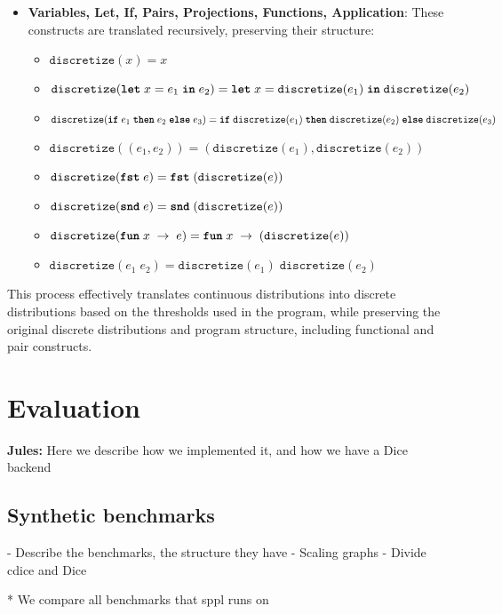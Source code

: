 \documentclass[acmsmall,screen,dvipsnames,x11names,nonacm,anonymous,review]{acmart}
\newcommand{\jules}[1]{{\color{blue}\textbf{Jules:} #1}}
\newcommand{\letkw}{\text{\ttfamily\bfseries let}}
\newcommand{\inkw}{\text{\ttfamily\bfseries in}}
\newcommand{\ifkw}{\text{\ttfamily\bfseries if}}
\newcommand{\thenkw}{\text{\ttfamily\bfseries then}}
\newcommand{\elsekw}{\text{\ttfamily\bfseries else}}
\newcommand{\fstkw}{\text{\ttfamily\bfseries fst}}
\newcommand{\sndkw}{\text{\ttfamily\bfseries snd}}
\newcommand{\funkw}{\text{\ttfamily\bfseries fun}}
\begin{document}
\begin{itemize}
    \item \textbf{Variables, Let, If, Pairs, Projections, Functions, Application}: These constructs are translated recursively, preserving their structure:
    \begin{itemize}
        \item $\texttt{discretize}(x) = x$
        \item $\texttt{discretize}(\letkw \; x = e_1 \; \inkw \; e_2) = \letkw \; x = \texttt{discretize}(e_1) \; \inkw \; \texttt{discretize}(e_2)$
        \item $\texttt{discretize}(\ifkw \; e_1 \; \thenkw \; e_2 \; \elsekw \; e_3) = \ifkw \; \texttt{discretize}(e_1) \; \thenkw \; \texttt{discretize}(e_2) \; \elsekw \; \texttt{discretize}(e_3)$
        \item $\texttt{discretize}((e_1, e_2)) = (\texttt{discretize}(e_1), \texttt{discretize}(e_2))$
        \item $\texttt{discretize}(\fstkw \; e) = \fstkw \; (\texttt{discretize}(e))$
        \item $\texttt{discretize}(\sndkw \; e) = \sndkw \; (\texttt{discretize}(e))$
        \item $\texttt{discretize}(\funkw \; x \; \rightarrow \; e) = \funkw \; x \; \rightarrow \; (\texttt{discretize}(e))$
        \item $\texttt{discretize}(e_1 \; e_2) = \texttt{discretize}(e_1) \; \texttt{discretize}(e_2)$
    \end{itemize}
\end{itemize}

This process effectively translates continuous distributions into discrete distributions based on the thresholds used in the program, while preserving the original discrete distributions and program structure, including functional and pair constructs.

\section{Evaluation}

\jules{Here we describe how we implemented it, and how we have a Dice backend}

\subsection{Synthetic benchmarks}
- Describe the benchmarks, the structure they have
- Scaling graphs
- Divide cdice and Dice

* We compare all benchmarks that sppl runs on
\end{document}
